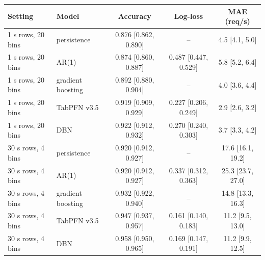 \begin{tabular}{llccc}
\toprule
Setting & Model & Accuracy & Log-loss & MAE (req/s) \\
\midrule
1 s rows, 20 bins & persistence & 0.876 [0.862, 0.890] & -- & 4.5 [4.1, 5.0] \\
1 s rows, 20 bins & AR(1) & 0.874 [0.860, 0.887] & 0.487 [0.447, 0.529] & 5.8 [5.2, 6.4] \\
1 s rows, 20 bins & gradient boosting & 0.892 [0.880, 0.904] & -- & 4.0 [3.6, 4.4] \\
1 s rows, 20 bins & TabPFN v3.5 & 0.919 [0.909, 0.929] & 0.227 [0.206, 0.249] & 2.9 [2.6, 3.2] \\
1 s rows, 20 bins & DBN & 0.922 [0.912, 0.932] & 0.270 [0.240, 0.303] & 3.7 [3.3, 4.2] \\
\midrule
30 s rows, 4 bins & persistence & 0.920 [0.912, 0.927] & -- & 17.6 [16.1, 19.2] \\
30 s rows, 4 bins & AR(1) & 0.920 [0.912, 0.927] & 0.337 [0.312, 0.363] & 25.3 [23.7, 27.0] \\
30 s rows, 4 bins & gradient boosting & 0.932 [0.922, 0.940] & -- & 14.8 [13.3, 16.3] \\
30 s rows, 4 bins & TabPFN v3.5 & 0.947 [0.937, 0.957] & 0.161 [0.140, 0.183] & 11.2 [9.5, 13.0] \\
30 s rows, 4 bins & DBN & 0.958 [0.950, 0.965] & 0.169 [0.147, 0.191] & 11.2 [9.9, 12.5] \\
\bottomrule
\end{tabular}
